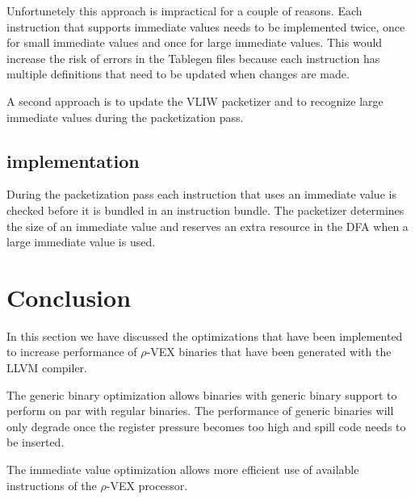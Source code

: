 Unfortunetely this approach is impractical for a couple of reasons. Each instruction that supports immediate values needs to be implemented twice, once for small immediate values and once for large immediate values. This would increase the risk of errors in the Tablegen files because each instruction has multiple definitions that need to be updated when changes are made.

A second approach is to update the VLIW packetizer and to recognize large immediate values during the packetization pass.


\subsection{implementation} %
\label{sub:implementation}
During the packetization pass each instruction that uses an immediate value is checked before it is bundled in an instruction bundle. The packetizer determines the size of an immediate value and reserves an extra resource in the DFA when a large immediate value is used.




\section{Conclusion}
In this section we have discussed the optimizations that have been implemented to increase performance of  $\rho$-VEX binaries that have been generated with the LLVM compiler.

The generic binary optimization allows binaries with generic binary support to perform on par with regular binaries. The performance of generic binaries will only degrade once the register pressure becomes too high and spill code needs to be inserted.

The immediate value optimization allows more efficient use of available instructions of the  $\rho$-VEX processor.
\acresetall
